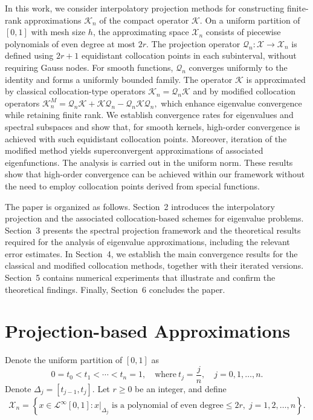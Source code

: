 \documentclass[]{interact}
\theoremstyle{plain}%
\theoremstyle{definition}
\theoremstyle{remark}
\begin{document}
In this work, we consider interpolatory projection methods for constructing finite-rank approximations $\mathcal{K}_n$ of the compact operator $\mathcal{K}$. 
On a uniform partition of $[0,1]$ with mesh size $h$, the approximating space $\mathcal{X}_n$ consists of piecewise polynomials of even degree at most $2r$. 
The projection operator $\mathcal{Q}_n : \mathcal{X} \to \mathcal{X}_n$ is defined using $2r+1$ equidistant collocation points in each subinterval, without requiring Gauss nodes. 
For smooth functions, $\mathcal{Q}_n$ converges uniformly to the identity and forms a uniformly bounded family. The operator $\mathcal{K}$ is approximated by classical collocation-type operators $\mathcal{K}_n = \mathcal{Q}_n \mathcal{K}$ and by modified collocation operators 
$
\mathcal{K}_n^{M}
=
\mathcal{Q}_n \mathcal{K}
+
\mathcal{K}\mathcal{Q}_n
-
\mathcal{Q}_n \mathcal{K}\mathcal{Q}_n,
$
which enhance eigenvalue convergence while retaining finite rank. We establish convergence rates for eigenvalues and spectral subspaces and show that, for smooth kernels, high-order convergence is achieved with such equidistant collocation points.  Moreover, iteration of the modified method yields superconvergent approximations of associated eigenfunctions. The analysis is carried out in the uniform norm. These results show that high-order convergence can be achieved within our framework without the need to employ collocation points derived from special functions.

The paper is organized as follows. Section~2 introduces the interpolatory projection and the associated collocation-based schemes for eigenvalue problems. Section~3 presents the spectral projection framework and the theoretical results required for the analysis of eigenvalue approximations, including the relevant error estimates. In Section~4, we establish the main convergence results for the classical and modified collocation methods, together with their iterated versions. Section~5 contains numerical experiments that illustrate and confirm the theoretical findings. Finally, Section~6 concludes the paper.

\section{Projection-based Approximations}

Denote the uniform partition of $[0,1]$ as
$$
0 =t_0 < t_1 < \cdots <t_n=1, \quad \text{where} ~ t_j = \displaystyle{\frac{j}{n}}, \quad j=0,1, \ldots, n.
$$ 
Denote $\Delta_{j} = [t_{j-1}, t_j]$. Let $r \ge 0$ be an integer, and define
$$
\mathcal{X}_n = \left\{x \in \mathcal{L}^\infty[0, 1] : x|_{\Delta_{j}} \text{ is a polynomial of even degree} \leq 2r, \; j=1,2, \ldots, n \right\}. 
$$ 
\end{document}
